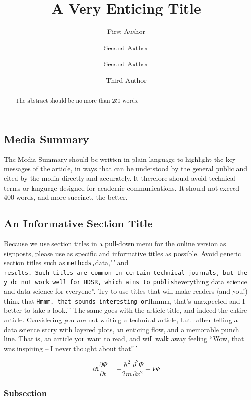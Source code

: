 \documentclass[
]{hdsr}
\title{A Very Enticing Title}
\author{First Author \and Second Author \and Second Author \and Third
Author}
\date{}
\begin{document}
\maketitle
\begin{abstract}
The abstract should be no more than 250 words.
\end{abstract}
\hypertarget{media-summary}{%
\subsection*{Media Summary}\label{media-summary}}

The Media Summary should be written in plain language to highlight the
key messages of the article, in ways that can be understood by the
general public and cited by the media directly and accurately. It
therefore should avoid technical terms or language designed for academic
communications. It should not exceed 400 words, and more succinct, the
better.

\hypertarget{sec-sec1}{%
\subsection{An Informative Section Title}\label{sec-sec1}}

Because we use section titles in a pull-down menu for the online version
as signposts, please use as specific and informative titles as possible.
Avoid generic section titles such as
\texttt{methods,\textquotesingle{}\textquotesingle{}}data,'\,' and
\texttt{results\textquotesingle{}\textquotesingle{}.\ Such\ titles\ are\ common\ in\ certain\ technical\ journals,\ but\ they\ do\ not\ work\ well\ for\ HDSR,\ which\ aims\ to\ publish}everything
data science and data science for everyone''. Try to use titles that
will make readers (and you!) think that
\texttt{Hmmm,\ that\ sounds\ interesting\textquotesingle{}\textquotesingle{}\ or}Hmmm,
that's unexpected and I better to take a look.'\,' The same goes with
the article title, and indeed the entire article. Considering you are
not writing a technical article, but rather telling a data science story
with layered plots, an enticing flow, and a memorable punch line. That
is, an article you want to read, and will walk away feeling ``Wow, that
was inspiring -- I never thought about that!'\,'

\[
    i\hbar \frac{\partial \Psi}{\partial t} = -\frac{\hbar^2}{2m}\frac{\partial^2 \Psi}{\partial x^2} + V \Psi
\]

\hypertarget{subsection}{%
\subsubsection{Subsection}\label{subsection}}
\end{document}
